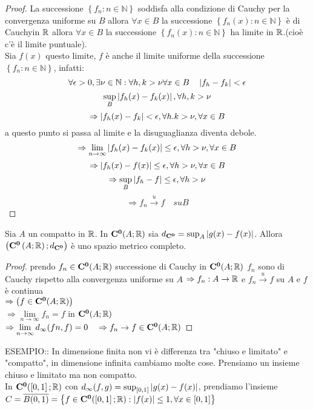 \begin{proof}
	La successione $\left\{ f_n:n\in\mathbb{N}\right\}$ soddisfa alla condizione di Cauchy per la convergenza uniforme su $B$ allora $\forall x\in B$ la successione $\left\{ f_n(x) :n\in\mathbb{N} \right\}$ è di Cauchyin $ \mathbb{R}$ allora $\forall x \in B$ la successione $\left\{ f_n(x):n\in\mathbb{N} \right\}$ ha limite in $ \mathbb{R}$.(cioè c'è il limite puntuale).\\
	Sia $f(x)$ questo limite, $f$ è anche il limite uniforme della successione $\left\{ f_n:n\in\mathbb{N} \right\}$, infatti:
	$$\forall\epsilon>0, \exists\nu\in\mathbb{N}: \forall h,k>\nu \forall x\in B \quad \left|f_h-f_k\right|<\epsilon$$
	$$\sup\limits_B\left|f_h(x)-f_k(x)\right|, \forall h,k>\nu$$
	$$\Rightarrow \left|f_h(x)-f_k\right|<\epsilon,\forall h.k>\nu, \forall x \in B$$
	a questo punto si passa al limite e la disuguaglianza diventa debole.
	$$\Rightarrow \lim\limits_{n\to\infty}\left|f_h(x)-f_k(x)\right|\le\epsilon, \forall h>\nu, \forall x\in B$$
	$$\Rightarrow\left|f_h(x)-f(x)\right|\le\epsilon, \forall h>\nu, \forall x\in B$$
	$$\Rightarrow\sup\limits_B\left|f_h-f\right|\le\epsilon, \forall h>\nu$$
	$$\Rightarrow f_n\overset{u}{\to}f\quad su B$$
\end{proof}
\proposition
Sia $A$ un compatto in $ \mathbb{R}$. In $\mathbf{C^{0}}(A; \mathbb{R})$ sia $d_{\mathbf{C^{0}}}=\sup_A\left|g(x)-f(x)\right|$. Allora $\left( \mathbf{C^{0}}\left(A; \mathbb{R}\right);d_{\mathbf{C^{0}}}\right)$ è uno spazio metrico completo.
\begin{proof}
	prendo $f_n\in \mathbf{C^{0}}(A; \mathbb{R})$ successione di Cauchy in $\mathbf{C^{0}}(A; \mathbb{R})$
	$f_n$ sono di Cauchy rispetto alla convergenza uniforme su $A$
	$\Rightarrow f_n:A\to \mathbb{R}$ e $f_n\overset{u}{\to}f$ su $A$ e $f$ è continua\\ $\Rightarrow\left(f\in \mathbf{C^{0}}(A; \mathbb{R})\right)$\\
	$\Rightarrow\lim\limits_{n\to\infty}f_n=f$ in $\mathbf{C^{0}}(A; \mathbb{R})$\\
	$\Rightarrow\lim\limits_{n\to\infty}d_{\infty}(fn,f)=0\quad\Rightarrow f_n\to f\in \mathbf{C^{0}}(A; \mathbb{R})$
\end{proof}
ESEMPIO:: In dimensione finita non vi è differenza tra "chiuso e limitato" e "compatto", in dimensione infinita cambiamo molte cose.
Prensiamo un insieme chiuso e limitato ma non compatto.\\
In $\mathbf{C^{0}}(\left[0,1\right]; \mathbb{R})$ con $d_\infty(f,g)=\sup_{\left[0,1\right]}\left|g(x)-f(x)\right|$, prendiamo l'insieme $C=\overline{B(0,1)}=\left\{f\in \mathbf{C^{0}}(\left[0,1\right]; \mathbb{R}):\left|f(x)\right|\le 1, \forall x \in\left[0,1\right]\right\}$
